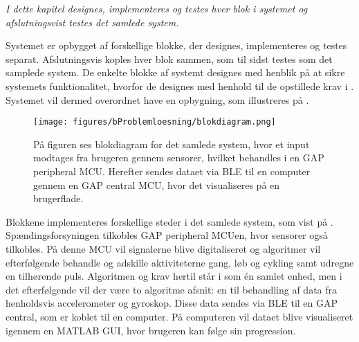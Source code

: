 \textit{I dette kapitel designes, implementeres og testes hver blok i systemet og afslutningsvist testes det samlede system.}

Systemet er opbygget af forskellige blokke, der designes, implementeres og testes separat. Afslutningsvis koples hver blok sammen, som til sidst testes som det samplede system. %
De enkelte blokke af systemt designes med henblik på at sikre systemets funktionalitet, hvorfor de designes med henhold til de opstillede krav i . Systemet vil dermed overordnet have en opbygning, som illustreres på .
\begin{figure}[H]
	\centering
	\texttt{[image: figures/bProblemloesning/blokdiagram.png]}
	\caption{På figuren ses blokdiagram for det samlede system, hvor et input modtages fra brugeren gennem sensorer, hvilket behandles i en GAP peripheral MCU. Herefter sendes dataet via BLE til en computer gennem en GAP central MCU, hvor det visualiseres på en brugerflade.}
	\label{fig:design_blokdiagram}
\end{figure}
Blokkene implementeres forskellige steder i det samlede system, som vist på . Spændingsforsyningen tilkobles GAP peripheral MCUen, hvor sensorer også tilkobles. På denne MCU vil signalerne blive digitaliseret og algoritmer vil efterfølgende behandle og adskille aktiviteterne gang, løb og cykling samt udregne en tilhørende puls. Algoritmen og krav hertil står i  som én samlet enhed, men i det efterfølgende vil der være to algoritme afsnit: en til behandling af data fra henholdsvis accelerometer og gyroskop. Disse data sendes via BLE til en GAP central, som er koblet til en computer. På computeren vil dataet blive visualiseret igennem en MATLAB GUI, hvor brugeren kan følge sin progression.